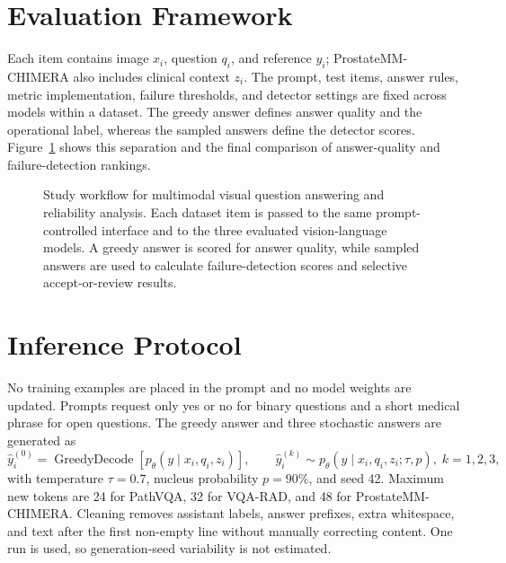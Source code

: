 \section{Evaluation Framework}

Each item contains image $x_i$, question $q_i$, and reference $y_i$; ProstateMM-CHIMERA also includes clinical context $z_i$. The prompt, test items, answer rules, metric implementation, failure thresholds, and detector settings are fixed across models within a dataset. The greedy answer defines answer quality and the operational label, whereas the sampled answers define the detector scores. Figure~\ref{fig:reliability-centred-framework} shows this separation and the final comparison of answer-quality and failure-detection rankings.

\begin{figure}[htbp]
    \centering
    \resizebox{\textwidth}{!}{}
    \caption{Study workflow for multimodal visual question answering and reliability analysis. Each dataset item is passed to the same prompt-controlled interface and to the three evaluated vision-language models. A greedy answer is scored for answer quality, while sampled answers are used to calculate failure-detection scores and selective accept-or-review results.}
    \label{fig:reliability-centred-framework}
\end{figure}

\section{Inference Protocol}

No training examples are placed in the prompt and no model weights are updated. Prompts request only yes or no for binary questions and a short medical phrase for open questions. The greedy answer and three stochastic answers are generated as
\begin{equation}
\hat{y}_i^{(0)}=\operatorname{GreedyDecode}[p_\theta(y\mid x_i,q_i,z_i)], \qquad
\hat{y}_i^{(k)}\sim p_\theta(y\mid x_i,q_i,z_i;\tau,p),\; k=1,2,3,
\end{equation}
with temperature $\tau=0.7$, nucleus probability $p=90\%$, and seed 42. Maximum new tokens are 24 for PathVQA, 32 for VQA-RAD, and 48 for ProstateMM-CHIMERA. Cleaning removes assistant labels, answer prefixes, extra whitespace, and text after the first non-empty line without manually correcting content. One run is used, so generation-seed variability is not estimated.

